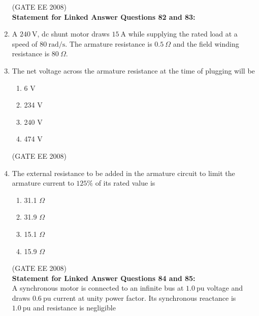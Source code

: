 \documentclass[journal,12pt,onecolumn]{IEEEtran}
\theoremstyle{remark}
\begin{document}
\begin{enumerate}[start=1, label=Q.\arabic*]
\begin{enumerate}
\end{enumerate}
\hfill (GATE EE 2008) \\[5mm]


\textbf{Statement for Linked Answer Questions 82 and 83:}\\

\item A $240\ \text{V}$, dc shunt motor draws $15\ \text{A}$ while supplying the rated load at a speed of $80\ \text{rad/s}$. The armature resistance is $0.5\ \Omega$ and the field winding resistance is $80\ \Omega$.
\\ [5mm]

\item The net voltage across the armature resistance at the time of plugging will be

\begin{multicols}{2}
\begin{enumerate}
    \item 6 V
    \item 234 V
    \item 240 V
    \item 474 V
\end{enumerate}
\end{multicols}
\hfill (GATE EE 2008) \\[5mm]

\item The external resistance to be added in the armature circuit to limit the armature current to $125\%$ of its rated value is

\begin{multicols}{2}
\begin{enumerate}
    \item 31.1 $\Omega$
    \item 31.9 $\Omega$
    \item 15.1 $\Omega$
    \item 15.9 $\Omega$
\end{enumerate}
\end{multicols}
\hfill (GATE EE 2008) \\[5mm]

\textbf{Statement for Linked Answer Questions 84 and 85:}\\

 A synchronous motor is connected to an infinite bus at $1.0\ \text{pu}$ voltage and draws $0.6\ \text{pu}$ current at unity power factor. Its synchronous reactance is $1.0\ \text{pu}$ and resistance is negligible\\


\end{enumerate}
\end{document}
